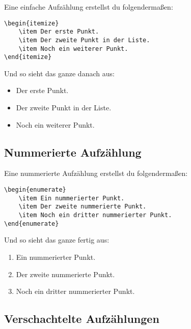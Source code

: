 Eine einfache Aufzählung erstellst du folgendermaßen:
\begin{lstlisting}
\begin{itemize}
	\item Der erste Punkt.
	\item Der zweite Punkt in der Liste.
	\item Noch ein weiterer Punkt.
\end{itemize}
\end{lstlisting}

Und so sieht das ganze danach aus:

\begin{itemize}
	\item Der erste Punkt.
	\item Der zweite Punkt in der Liste.
	\item Noch ein weiterer Punkt.
\end{itemize}

\subsection{Nummerierte Aufzählung}

Eine nummerierte Aufzählung erstellst du folgendermaßen:
\begin{lstlisting}
\begin{enumerate}
	\item Ein nummerierter Punkt.
	\item Der zweite nummerierte Punkt.
	\item Noch ein dritter nummerierter Punkt.
\end{enumerate}
\end{lstlisting}

Und so sieht das ganze fertig aus:

\begin{enumerate}
	\item Ein nummerierter Punkt.
	\item Der zweite nummerierte Punkt.
	\item Noch ein dritter nummerierter Punkt.
\end{enumerate}

\subsection{Verschachtelte Aufzählungen}

